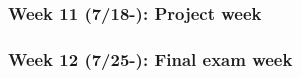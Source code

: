 \subsubsection{Week 11 (7/18-): Project week} %
\subsubsection{Week 12 (7/25-): Final exam week}%


